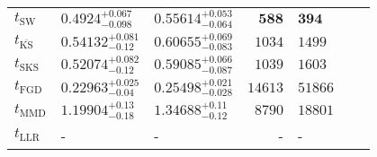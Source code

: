 \begin{tabular}{l|llr|llr}
	\midrule
	$t_{\mathrm{SW}}$ & $0.4924_{-0.098}^{+0.067}$ & $0.55614_{-0.064}^{+0.053}$ & ${\mathbf{588}}$ & ${\mathbf{394}}$ \\
	$t_{\overline{\mathrm{KS}}}$ & $0.54132_{-0.12}^{+0.081}$ & $0.60655_{-0.083}^{+0.069}$ & $1034$ & $1499$ \\
	$t_{\mathrm{SKS}}$ & $0.52074_{-0.12}^{+0.082}$ & $0.59085_{-0.087}^{+0.066}$ & $1039$ & $1603$ \\
	$t_{\mathrm{FGD}}$ & ${\mathbf{0.22963_{-0.04}^{+0.025}}}$ & ${\mathbf{0.25498_{-0.028}^{+0.021}}}$ & $14613$ & $51866$ \\
	$t_{\mathrm{MMD}}$ & $1.19904_{-0.18}^{+0.13}$ & $1.34688_{-0.12}^{+0.11}$ & $8790$ & $18801$ \\
	$t_{\mathrm{LLR}}$ & - & - & - & - \\
	\bottomrule
\end{tabular}